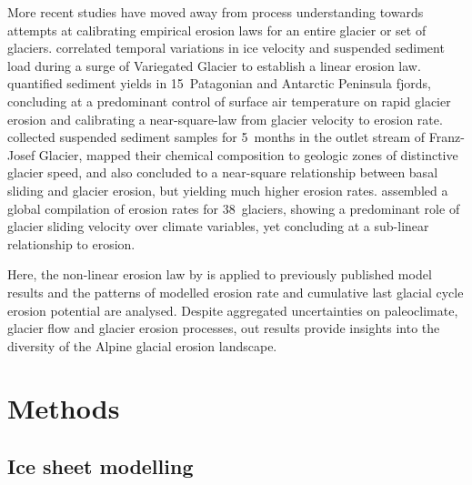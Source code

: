 \documentclass[utf8]{article}
\begin{document}
    More recent studies have moved away from process
    understanding towards attempts at calibrating empirical erosion laws for an entire
    glacier or set of glaciers. \citet{Humphrey.Raymond.1994} correlated
    temporal variations in ice velocity and suspended sediment load during a
    surge of Variegated Glacier to establish a linear erosion law.
    \citet{Koppes.etal.2015} quantified sediment
    yields in 15~Patagonian and Antarctic Peninsula fjords, concluding at a
    predominant control of surface air temperature on rapid glacier erosion and
    calibrating a near-square-law from glacier velocity to erosion rate.
    \citet{Herman.etal.2015} collected suspended sediment samples for 5~months
    in the outlet stream of Franz-Josef Glacier, mapped their chemical
    composition to geologic zones of distinctive glacier speed, and also
    concluded to a near-square relationship between basal sliding and glacier
    erosion, but yielding much higher erosion rates.
    \citet{Cook.etal.2020} assembled a global compilation of erosion rates for
    38~glaciers, showing a predominant role of glacier sliding velocity over
    climate variables, yet concluding at a sub-linear relationship to erosion.

    Here, the non-linear erosion law by \citet{Koppes.etal.2015} is applied to
    previously published model results \citep{Seguinot.etal.2018} and the
    patterns of modelled erosion rate and cumulative last glacial cycle erosion
    potential are analysed. Despite aggregated uncertainties on paleoclimate,
    glacier flow and glacier erosion processes, out results provide insights
    into the diversity of the Alpine glacial erosion landscape.


\section{Methods}

\subsection{Ice sheet modelling}
\end{document}
